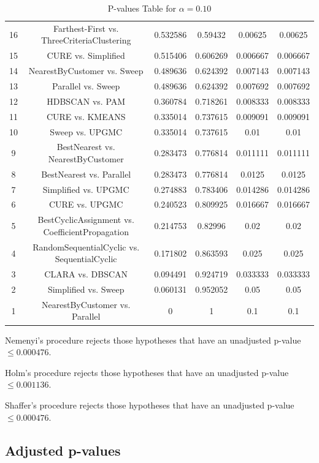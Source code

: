 \documentclass[a4paper,10pt]{article}
\begin{document}
\begin{landscape}
\begin{table}[!htp]
\begin{tabular}{cccccc}
16&Farthest-First vs. ThreeCriteriaClustering&0.532586&0.59432&0.00625&0.00625\\
15&CURE vs. Simplified&0.515406&0.606269&0.006667&0.006667\\
14&NearestByCustomer vs. Sweep&0.489636&0.624392&0.007143&0.007143\\
13&Parallel vs. Sweep&0.489636&0.624392&0.007692&0.007692\\
12&HDBSCAN vs. PAM&0.360784&0.718261&0.008333&0.008333\\
11&CURE vs. KMEANS&0.335014&0.737615&0.009091&0.009091\\
10&Sweep vs. UPGMC&0.335014&0.737615&0.01&0.01\\
9&BestNearest vs. NearestByCustomer&0.283473&0.776814&0.011111&0.011111\\
8&BestNearest vs. Parallel&0.283473&0.776814&0.0125&0.0125\\
7&Simplified vs. UPGMC&0.274883&0.783406&0.014286&0.014286\\
6&CURE vs. UPGMC&0.240523&0.809925&0.016667&0.016667\\
5&BestCyclicAssignment vs. CoefficientPropagation&0.214753&0.82996&0.02&0.02\\
4&RandomSequentialCyclic vs. SequentialCyclic&0.171802&0.863593&0.025&0.025\\
3&CLARA vs. DBSCAN&0.094491&0.924719&0.033333&0.033333\\
2&Simplified vs. Sweep&0.060131&0.952052&0.05&0.05\\
1&NearestByCustomer vs. Parallel&0&1&0.1&0.1\\
\hline
\end{tabular}
\caption{P-values Table for $\alpha=0.10$}
\end{table}Nemenyi's procedure rejects those hypotheses that have an unadjusted p-value $\le0.000476$.

Holm's procedure rejects those hypotheses that have an unadjusted p-value $\le0.001136$.

Shaffer's procedure rejects those hypotheses that have an unadjusted p-value $\le0.000476$.

\pagebreak

\subsection{Adjusted p-values}


\end{landscape}
\end{document}
